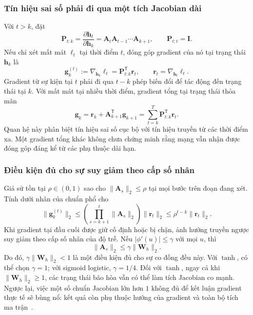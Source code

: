 \documentclass[12pt]{article}
\begin{document}
\subsubsection{Tín hiệu sai số phải đi qua một tích Jacobian dài}
Với $t>k$, đặt
\begin{equation}
 \mathbf P_{t:k}=\frac{\partial\mathbf h_t}{\partial\mathbf h_k}
 =\mathbf A_t\mathbf A_{t-1}\cdots\mathbf A_{k+1},\qquad
 \mathbf P_{t:t}=\mathbf I.
 \label{eq:long-rnn-product}
\end{equation}
Nếu chỉ xét mất mát $\ell_t$ tại thời điểm $t$, đóng góp gradient của nó tại trạng thái $\mathbf h_k$ là
\begin{equation}
 \mathbf g_k^{(t)}
 :=\nabla_{\mathbf h_k}\ell_t
 =\mathbf P_{t:k}^{\mathsf T}\mathbf r_t,
 \qquad \mathbf r_t=\nabla_{\mathbf h_t}\ell_t.
 \label{eq:long-rnn-credit}
\end{equation}
Gradient từ sự kiện tại $t$ phải đi qua $t-k$ phép biến đổi để tác động đến trạng thái tại $k$. Với mất mát tại nhiều thời điểm, gradient tổng tại trạng thái thỏa mãn
\begin{equation}
 \mathbf g_k=\mathbf r_k+\mathbf A_{k+1}^{\mathsf T}\mathbf g_{k+1}
 =\sum_{t=k}^{T}\mathbf P_{t:k}^{\mathsf T}\mathbf r_t.
 \label{eq:long-rnn-total-state}
\end{equation}
Quan hệ này phân biệt tín hiệu sai số cục bộ với tín hiệu truyền từ các thời điểm xa. Một gradient tổng khác không chưa chứng minh rằng mạng vẫn nhận được đóng góp đáng kể từ các phụ thuộc dài hạn.

\subsubsection{Điều kiện đủ cho sự suy giảm theo cấp số nhân}
Giả sử tồn tại $\rho\in(0,1)$ sao cho $\|\mathbf A_s\|_2\leq\rho$ tại mọi bước trên đoạn đang xét. Tính dưới nhân của chuẩn phổ cho
\begin{equation}
 \|\mathbf g_k^{(t)}\|_2
 \leq\left(\prod_{s=k+1}^{t}\|\mathbf A_s\|_2\right)\|\mathbf r_t\|_2
 \leq\rho^{t-k}\|\mathbf r_t\|_2.
 \label{eq:long-rnn-bound}
\end{equation}
Khi gradient tại đầu cuối được giữ cố định hoặc bị chặn, ảnh hưởng truyền ngược suy giảm theo cấp số nhân của độ trễ. Nếu $|\phi'(u)|\leq\gamma$ với mọi $u$, thì
\begin{equation}
 \|\mathbf A_s\|_2\leq\gamma\|\mathbf W_h\|_2.
 \label{eq:long-rnn-sufficient}
\end{equation}
Do đó, $\gamma\|\mathbf W_h\|_2<1$ là một điều kiện đủ cho sự co đồng đều này. Với $\tanh$, có thể chọn $\gamma=1$; với sigmoid logistic, $\gamma=1/4$. Đối với $\tanh$, ngay cả khi $\|\mathbf W_h\|_2\geq1$, các trạng thái bão hòa vẫn có thể làm tích Jacobian co mạnh. Ngược lại, việc một số chuẩn Jacobian lớn hơn $1$ không đủ để kết luận gradient thực tế sẽ bùng nổ: kết quả còn phụ thuộc hướng của gradient và toàn bộ tích ma trận~\cite[\S2.1]{long-pascanu2013}.
\end{document}
